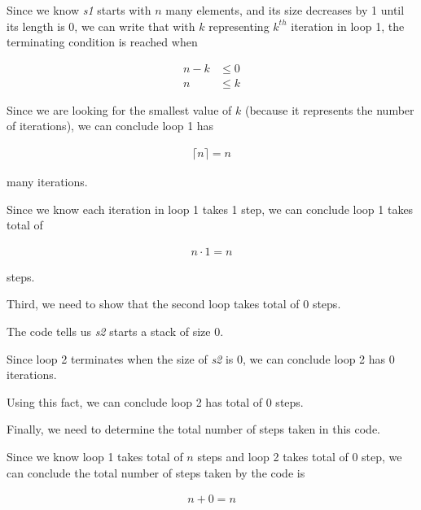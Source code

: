 \documentclass[12pt]{article}
\begin{document}
\begin{enumerate}[a.]
    \bigskip

    Since we know \textit{s1} starts with $n$ many elements, and its size decreases
    by 1 until its length is 0, we can write that with $k$ representing
    $k^{th}$ iteration in loop 1, the terminating condition is reached when

    \setcounter{equation}{0}
    \begin{align}
        n - k &\leq 0\\
        n &\leq k
    \end{align}

    \bigskip

    Since we are looking for the smallest value of $k$ (because it represents
    the number of iterations), we can conclude loop 1 has

    \begin{align}
        \lceil n \rceil = n
    \end{align}

    many iterations.

    \bigskip

    Since we know each iteration in loop 1 takes 1 step, we can conclude
    loop 1 takes total of

    \begin{align}
        n \cdot 1 = n
    \end{align}

    steps.

    \bigskip

    Third, we need to show that the second loop takes total of 0 steps.

    \bigskip

    The code tells us \textit{s2} starts a stack of size 0.

    \bigskip

    Since loop 2 terminates when the size of \textit{s2} is 0,
    we can conclude loop 2 has 0 iterations.

    \bigskip

    Using this fact, we can conclude loop 2 has total of 0 steps.

    \bigskip

    Finally, we need to determine the total number of steps taken in this code.

    \bigskip

    Since we know loop 1 takes total of $n$ steps and loop 2 takes total of 0 step, we can
    conclude the total number of steps taken by the code is

    \begin{align}
        n + 0 = n
    \end{align}


\end{enumerate}
\end{document}
